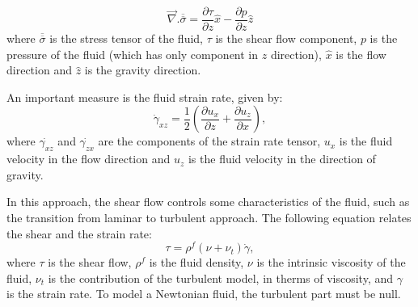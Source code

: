 \begin{equation}
    \vec{\nabla}.\overline{\overline{\sigma}} = \frac{\partial \tau}{\partial z} \hat{x} - \frac{\partial p}{\partial z} \hat{z}
    \label{equ:divergente_tensor_tensao}
\end{equation}
where $\overline{\overline{\sigma}}$ is the stress tensor of the fluid, $\tau$ is the shear flow component, $p$ is the pressure of the fluid (which has only component in $z$ direction), $\hat{x}$ is the flow direction and $\hat{z}$ is the gravity direction.

    An important measure is the fluid strain rate, given by: 
\begin{equation}
    \dot{\gamma}_{xz} = \frac{1}{2} \left(\frac{\partial u_{x}}{\partial z} +\frac{\partial u_{z}}{\partial x} \right),
    \label{equ:taxa_deformacao}
\end{equation}
where $\dot{\gamma_{xz}}$ and $\dot{\gamma_{zx}}$ are the components of the strain rate tensor, $u_{x}$ is the fluid velocity in the flow direction and $u_{z}$ is the fluid velocity in the direction of gravity.

    In this approach, the shear flow controls some characteristics of the fluid, such as the transition from laminar to turbulent approach. The following equation relates the shear and the strain rate:
\begin{equation}
    \tau = \rho^{f}(\nu+\nu_{t})\dot{\gamma},
    \label{equ:cisalhamento}
\end{equation}
where $\tau$ is the shear flow, $\rho^{f}$ is the fluid density, $\nu$ is the intrinsic viscosity of the fluid, $\nu_t$ is the contribution of the turbulent model, in therms of viscosity, and $\gamma$ is the strain rate. To model a Newtonian fluid, the turbulent part must be null.

